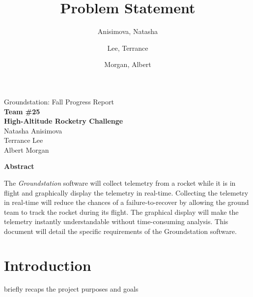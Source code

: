 \documentclass[10pt,draftclsnofoot,onecolumn]{IEEEtran}
\begin{document}
	\singlespace
	
	\title{\vspace{2in}Problem Statement}
	
	\author {
		Anisimova, Natasha
		\and
		Lee, Terrance
		\and
		Morgan, Albert
	}
	
	
	\pagestyle{empty}
	\vspace*{2in}
	\begin{center}
		\huge
		Groundstation: Fall Progress Report \\
		\normalsize
		\vspace{5mm}
		\textbf{
			Team \#25\\
			High-Altitude Rocketry Challenge\\
		}
		\vspace{1mm}
		Natasha Anisimova\\
		Terrance Lee\\
		Albert Morgan
	\end{center}
	
	\vspace{5mm}
	
	\begin{center}
		\textbf{Abstract}
	\end{center}
	
	
	The \textit{Groundstation} software will collect telemetry from a rocket while it is in flight and graphically display the telemetry in real-time.
	Collecting the telemetry in real-time will reduce the chances of a failure-to-recover by allowing the ground team to track the rocket during its flight.
	The graphical display will make the telemetry instantly understandable without time-consuming analysis.
	This document will detail the specific requirements of the Groundstation software.

	
	
	\newpage
	
	\tableofcontents
	\newpage
	
	\pagestyle{headings}


	\section{Introduction}
	
	briefly recaps the project purposes and goals
	
\end{document}

